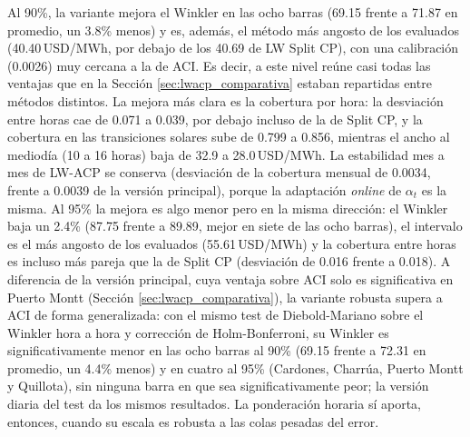 Al 90\%, la variante mejora el Winkler en las ocho barras (69.15 frente a 71.87 en promedio, un 3.8\% menos) y es, además, el método más angosto de los evaluados (40.40\,USD/MWh, por debajo de los 40.69 de LW Split CP), con una calibración (0.0026) muy cercana a la de ACI. Es decir, a este nivel reúne casi todas las ventajas que en la Sección \ref{sec:lwacp_comparativa} estaban repartidas entre métodos distintos. La mejora más clara es la cobertura por hora: la desviación entre horas cae de 0.071 a 0.039, por debajo incluso de la de Split CP, y la cobertura en las transiciones solares sube de 0.799 a 0.856, mientras el ancho al mediodía (10 a 16 horas) baja de 32.9 a 28.0\,USD/MWh. La estabilidad mes a mes de LW-ACP se conserva (desviación de la cobertura mensual de 0.0034, frente a 0.0039 de la versión principal), porque la adaptación \textit{online} de $\alpha_t$ es la misma. Al 95\% la mejora es algo menor pero en la misma dirección: el Winkler baja un 2.4\% (87.75 frente a 89.89, mejor en siete de las ocho barras), el intervalo es el más angosto de los evaluados (55.61\,USD/MWh) y la cobertura entre horas es incluso más pareja que la de Split CP (desviación de 0.016 frente a 0.018). A diferencia de la versión principal, cuya ventaja sobre ACI solo es significativa en Puerto Montt (Sección \ref{sec:lwacp_comparativa}), la variante robusta supera a ACI de forma generalizada: con el mismo test de Diebold-Mariano sobre el Winkler hora a hora y corrección de Holm-Bonferroni, su Winkler es significativamente menor en las ocho barras al 90\% (69.15 frente a 72.31 en promedio, un 4.4\% menos) y en cuatro al 95\% (Cardones, Charrúa, Puerto Montt y Quillota), sin ninguna barra en que sea significativamente peor; la versión diaria del test da los mismos resultados. La ponderación horaria sí aporta, entonces, cuando su escala es robusta a las colas pesadas del error.

